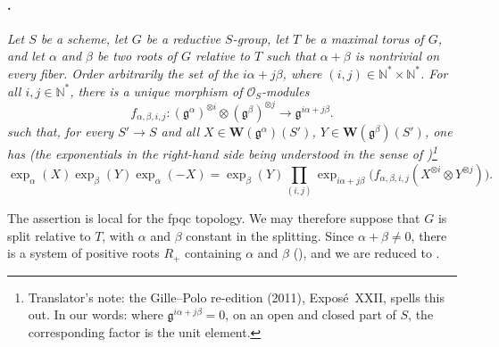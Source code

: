\paragraph{.}
\textit{Let \(S\) be a scheme, let \(G\) be a reductive
\(S\)-group, let \(T\) be a maximal torus of \(G\), and let
\(\alpha\) and \(\beta\) be two roots of \(G\) relative to \(T\) such
that \(\alpha+\beta\) is nontrivial on every fiber. Order
arbitrarily the set of the \(i\alpha+j\beta\), where
\((i,j)\in\mathbb N^*\times\mathbb N^*\). For all
\(i,j\in\mathbb N^*\), there is
a unique morphism of \(\mathcal O_S\)-modules}
\[
  f_{\alpha,\beta,i,j}:
  (\mathfrak g^\alpha)^{\otimes i}
  \otimes
  (\mathfrak g^\beta)^{\otimes j}
  \longrightarrow
  \mathfrak g^{i\alpha+j\beta}.
\]
\textit{such that, for every \(S'\to S\) and all
\(X\in\mathbf W(\mathfrak g^\alpha)(S')\),
\(Y\in\mathbf W(\mathfrak g^\beta)(S')\), one has
\textup{(the exponentials in the right-hand side being understood
in the sense of )}\footnote{Translator's note: the Gille--Polo re-edition (2011), Exposé~XXII,
spells this out. In our words: where \(\mathfrak g^{i\alpha+j\beta}=0\), on an open
and closed part of \(S\), the corresponding factor is the unit element.}}
\[
  \exp_\alpha(X)\exp_\beta(Y)\exp_\alpha(-X)
  =
  \exp_\beta(Y)
  \prod_{(i,j)}
    \exp_{i\alpha+j\beta}
      \bigl(f_{\alpha,\beta,i,j}(X^{\otimes i}\otimes
      Y^{\otimes j})\bigr).
\]

The assertion is local for the fpqc topology. We may
therefore suppose that \(G\) is split relative to \(T\), with
\(\alpha\) and \(\beta\) constant in the splitting. Since
\(\alpha+\beta\ne0\), there is a system of positive roots \(R_+\)
containing \(\alpha\) and \(\beta\) \textup{()},
and we are reduced to .


